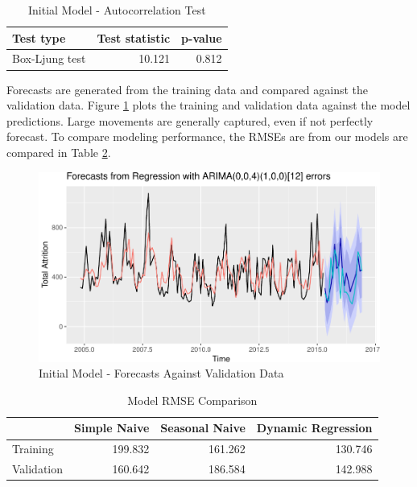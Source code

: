 \documentclass[12pt,letterpaper,toc=flat,oneside]{report}
\theoremstyle{definition}
\theoremstyle{definition}
\theoremstyle{definition}
\theoremstyle{remark}
\begin{document}
\begin{table}[!h]

\caption{\label{tab:dynreg1-boxtest}Initial Model - Autocorrelation Test}
\centering
\begin{tabular}[t]{lrr}
\toprule
\bfseries{Test type} & \bfseries{Test statistic} & \bfseries{p-value}\\
\midrule
Box-Ljung test & 10.121 & 0.812\\
\bottomrule
\end{tabular}
\end{table}

Forecasts are generated from the training data and compared against the
validation data. Figure \ref{fig:dynreg1-forecast} plots the training
and validation data against the model predictions. Large movements are
generally captured, even if not perfectly forecast. To compare modeling
performance, the RMSEs are from our models are compared in Table
\ref{tab:model-compare-1}.

\begin{figure}[H]

{\centering \includegraphics{elliott-econometric-personnel-retention-18_files/figure-latex/dynreg1-forecast-1} 

}

\caption{Initial Model - Forecasts Against Validation Data}\label{fig:dynreg1-forecast}
\end{figure}

\begin{table}[!h]

\caption{\label{tab:model-compare-1}Model RMSE Comparison}
\centering
\begin{tabular}[t]{lrrr}
\toprule
\bfseries{ } & \bfseries{Simple Naive} & \bfseries{Seasonal Naive} & \bfseries{Dynamic Regression}\\
\midrule
Training & 199.832 & 161.262 & 130.746\\
Validation & 160.642 & 186.584 & 142.988\\
\bottomrule
\end{tabular}
\end{table}
\end{document}
